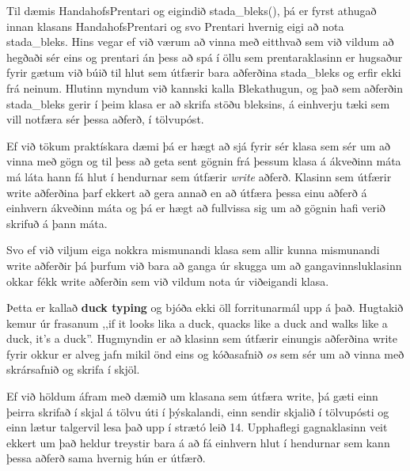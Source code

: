 Til dæmis HandahofsPrentari og eigindið stada\_bleks(), þá er fyrst athugað innan klasans HandahofsPrentari og svo Prentari hvernig eigi að nota stada\_bleks.
Hins vegar ef við værum að vinna með eitthvað sem við vildum að hegðaði sér eins og prentari án þess að spá í öllu sem prentaraklasinn er hugsaður fyrir gætum við búið til hlut sem útfærir bara aðferðina stada\_bleks og erfir ekki frá neinum.
Hlutinn myndum við kannski kalla Blekathugun, og það sem aðferðin stada\_bleks gerir í þeim klasa er að skrifa stöðu bleksins, á einhverju tæki sem vill notfæra sér þessa aðferð, í tölvupóst.

Ef við tökum praktískara dæmi þá er hægt að sjá fyrir sér klasa sem sér um að vinna með gögn og til þess að geta sent gögnin frá þessum klasa á ákveðinn máta má láta hann fá hlut í hendurnar sem útfærir \textit{write} aðferð.
Klasinn sem útfærir write aðferðina þarf ekkert að gera annað en að útfæra þessa einu aðferð á einhvern ákveðinn máta og þá er hægt að fullvissa sig um að gögnin hafi verið skrifuð á þann máta.

Svo ef við viljum eiga nokkra mismunandi klasa sem allir kunna mismunandi write aðferðir þá þurfum við bara að ganga úr skugga um að gangavinnsluklasinn okkar fékk write aðferðin sem við vildum nota úr viðeigandi klasa.

Þetta er kallað \textbf{duck typing} og bjóða ekki öll forritunarmál upp á það.
Hugtakið kemur úr frasanum ,,if it looks lika a duck, quacks like a duck and walks like a duck, it's a duck''.
Hugmyndin er að klasinn sem útfærir einungis aðferðina write fyrir okkur er alveg jafn mikil önd eins og kóðasafnið \textit{os} sem sér um að vinna með skrársafnið og skrifa í skjöl.

Ef við höldum áfram með dæmið um klasana sem útfæra write, þá gæti einn þeirra skrifað í skjal á tölvu úti í þýskalandi, einn sendir skjalið í tölvupósti og einn lætur talgervil lesa það upp í strætó leið 14.
Upphaflegi gagnaklasinn veit ekkert um það heldur treystir bara á að fá einhvern hlut í hendurnar sem kann þessa aðferð sama hvernig hún er útfærð.

\newpage

